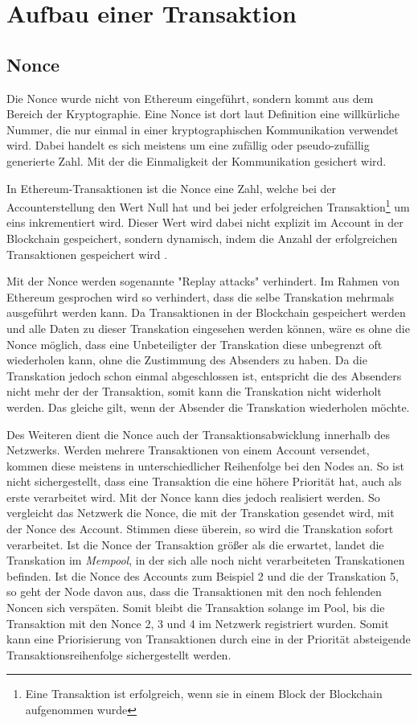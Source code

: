 \documentclass[runningheads]{llncs}
\begin{document}
\section{Aufbau einer Transaktion}

\subsection{Nonce}
\label{nonce}
Die Nonce wurde nicht von Ethereum eingeführt, sondern kommt aus dem Bereich der Kryptographie. Eine Nonce ist dort laut Definition %
eine willkürliche Nummer, die nur einmal in einer kryptographischen Kommunikation verwendet wird. Dabei handelt es sich meistens um eine zufällig oder pseudo-zufällig generierte Zahl. Mit der die Einmaligkeit der Kommunikation gesichert wird.

In Ethereum-Transaktionen ist die Nonce eine Zahl, welche bei der Accounterstellung den Wert Null hat und bei jeder erfolgreichen Transaktion\footnote{Eine Transaktion ist erfolgreich, wenn sie in einem Block der Blockchain aufgenommen wurde} um eins inkrementiert wird. Dieser Wert wird dabei nicht explizit im Account in der Blockchain gespeichert, sondern dynamisch, indem die Anzahl der erfolgreichen Transaktionen gespeichert wird \cite[S.101]{antonopoulos_mastering_2019}.

Mit der Nonce werden sogenannte "Replay attacks" verhindert. Im Rahmen von Ethereum gesprochen wird so verhindert, dass die selbe Transkation mehrmals ausgeführt werden kann. Da Transaktionen in der Blockchain gespeichert werden und alle Daten zu dieser Transkation eingesehen werden können, wäre es ohne die Nonce möglich, dass eine Unbeteiligter der Transkation diese unbegrenzt oft wiederholen kann, ohne die Zustimmung des Absenders zu haben. Da die Transkation jedoch schon einmal abgeschlossen ist, entspricht die des Absenders nicht mehr der der Transaktion, somit kann die Transkation nicht widerholt werden.
Das gleiche gilt, wenn der Absender die Transkation wiederholen möchte.

Des Weiteren dient die Nonce auch der Transaktionsabwicklung innerhalb des Netzwerks.  Werden mehrere Transaktionen von einem Account versendet, kommen diese meistens in unterschiedlicher Reihenfolge bei den Nodes an. So ist nicht sichergestellt, dass eine Transaktion die eine höhere Priorität hat, auch als erste verarbeitet wird. Mit der Nonce kann dies jedoch realisiert werden. So vergleicht das Netzwerk die Nonce, die mit der Transkation gesendet wird, mit der Nonce des Account. Stimmen diese überein, so wird die Transkation sofort verarbeitet. Ist die Nonce der Transaktion größer als die erwartet, landet die Transkation im \textit{Mempool}, in der sich alle noch nicht verarbeiteten Transkationen befinden. Ist die Nonce des Accounts zum Beispiel 2 und die der Transkation 5, so geht der Node davon aus, dass die Transaktionen mit den noch fehlenden Noncen sich verspäten. Somit bleibt die Transaktion solange im Pool, bis die Transaktion mit den Nonce 2, 3 und 4 im Netzwerk registriert wurden. Somit kann eine Priorisierung von Transaktionen durch eine in der Priorität absteigende Transaktionsreihenfolge sichergestellt werden.
\end{document}
